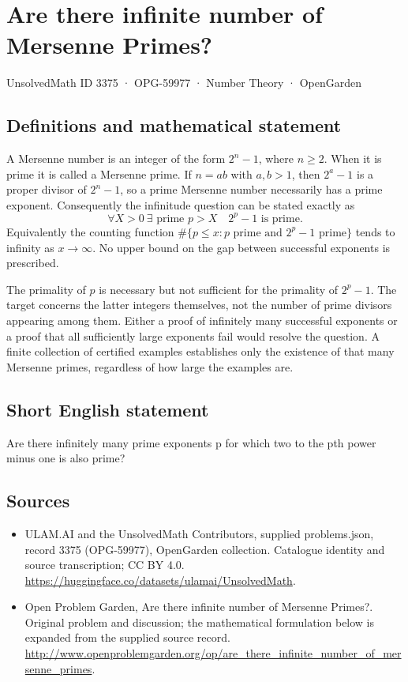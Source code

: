 \documentclass[11pt,a4paper]{article}
\begin{document}
\section*{Are there infinite number of Mersenne Primes?}\label{3375}
{\small UnsolvedMath ID 3375 · OPG-59977 · Number Theory · OpenGarden}
\subsection{Definitions and mathematical statement}
A Mersenne number is an integer of the form $2^n-1$, where $n\ge2$.
When it is prime it is called a Mersenne prime. If $n=ab$ with
$a,b>1$, then $2^a-1$ is a proper divisor of $2^n-1$, so a prime
Mersenne number necessarily has a prime exponent. Consequently the
infinitude question can be stated exactly as
\[
 \forall X>0\ \exists\text{ prime }p>X\quad 2^p-1\text{ is prime}.
\]
Equivalently the counting function
$\#\{p\le x:p\text{ prime and }2^p-1\text{ prime}\}$ tends to
infinity as $x\to\infty$. No upper bound on the gap between successful
exponents is prescribed.

The primality of $p$ is necessary but not sufficient for the primality
of $2^p-1$. The target concerns the latter integers themselves, not
the number of prime divisors appearing among them. Either a proof of
infinitely many successful exponents or a proof that all sufficiently
large exponents fail would resolve the question. A finite collection
of certified examples establishes only the existence of that many
Mersenne primes, regardless of how large the examples are.
\subsection{Short English statement}
Are there infinitely many prime exponents p for which two to the pth power minus one is also prime?
\subsection{Sources}
\begin{itemize}
\item[S1] ULAM.AI and the UnsolvedMath Contributors, supplied problems.json, record 3375 (OPG-59977), OpenGarden collection. Catalogue identity and source transcription; CC BY 4.0.
\url{https://huggingface.co/datasets/ulamai/UnsolvedMath}.
\item[S2] Open Problem Garden, Are there infinite number of Mersenne Primes?. Original problem and discussion; the mathematical formulation below is expanded from the supplied source record.
\url{http://www.openproblemgarden.org/op/are_there_infinite_number_of_mersenne_primes}.
\end{itemize}
\end{document}
